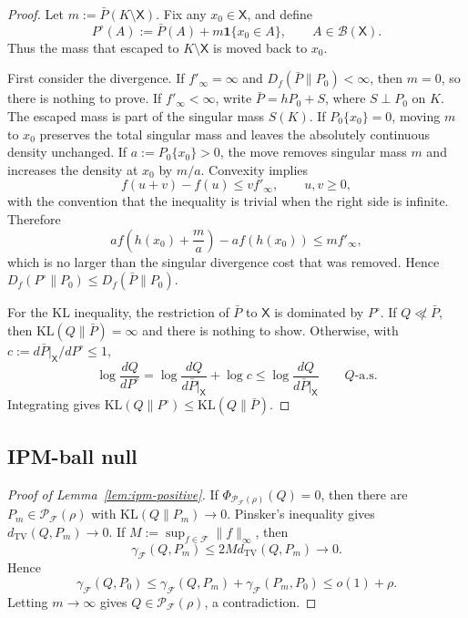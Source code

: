 \documentclass[11pt]{article}
\newcommand{\KL}{\mathrm{KL}}
\newcommand{\Pcal}{\mathcal{P}}
\newcommand{\Fcal}{\mathcal{F}}
\newcommand{\X}{\mathsf{X}}
\newcommand{\TV}{\mathrm{TV}}
\newcommand{\dd}{d}
\newcommand{\B}{\mathcal{B}}
\newcommand{\one}{\mathbf{1}}
\theoremstyle{definition}
\theoremstyle{definition}
\begin{document}
\begin{proof}
Let \(m:=\bar P(K\setminus\X)\).  Fix any \(x_0\in\X\), and define
\[
  P^\circ(A):=\bar P(A)+m\one\{x_0\in A\},\qquad A\in\B(\X).
\]
Thus the mass that escaped to \(K\setminus\X\) is moved back to \(x_0\).

First consider the divergence.  If \(f'_\infty=\infty\) and \(D_f(\bar P\|P_0)<\infty\), then \(m=0\), so there is nothing to prove.  If \(f'_\infty<\infty\), write \(\bar P=hP_0+S\), where \(S\perp P_0\) on \(K\).  The escaped mass is part of the singular mass \(S(K)\).  If \(P_0\{x_0\}=0\), moving \(m\) to \(x_0\) preserves the total singular mass and leaves the absolutely continuous density unchanged.  If \(a:=P_0\{x_0\}>0\), the move removes singular mass \(m\) and increases the density at \(x_0\) by \(m/a\).  Convexity implies
\[
  f(u+v)-f(u)\le v f'_\infty,
  \qquad u,v\ge0,
\]
with the convention that the inequality is trivial when the right side is infinite.  Therefore
\[
  a f\!\left(h(x_0)+\frac{m}{a}\right)-a f(h(x_0))
  \le m f'_\infty,
\]
which is no larger than the singular divergence cost that was removed.  Hence \(D_f(P^\circ\|P_0)\le D_f(\bar P\|P_0)\).

For the KL inequality, the restriction of \(\bar P\) to \(\X\) is dominated by \(P^\circ\).  If \(Q\not\ll\bar P\), then \(\KL(Q\|\bar P)=\infty\) and there is nothing to show.  Otherwise, with \(c:=\dd\bar P|_{\X}/\dd P^\circ\le1\),
\[
  \log\frac{\dd Q}{\dd P^\circ}
  =\log\frac{\dd Q}{\dd\bar P|_{\X}}+\log c
  \le \log\frac{\dd Q}{\dd\bar P|_{\X}}
  \qquad Q\text{-a.s.}
\]
Integrating gives \(\KL(Q\|P^\circ)\le\KL(Q\|\bar P)\).
\end{proof}


\subsection{IPM-ball null}\label{subsec:ipm}


\begin{proof}[Proof of Lemma~\ref{lem:ipm-positive}]
If \(\Phi_{\Pcal_{\Fcal}(\rho)}(Q)=0\), then there are \(P_m\in\Pcal_{\Fcal}(\rho)\) with \(\KL(Q\|P_m)\to0\).  Pinsker's inequality gives \(d_{\TV}(Q,P_m)\to0\).  If \(M:=\sup_{f\in\Fcal}\|f\|_\infty\), then
\[
  \gamma_{\Fcal}(Q,P_m)
  \le 2M d_{\TV}(Q,P_m)\to0.
\]
Hence
\[
  \gamma_{\Fcal}(Q,P_0)
  \le \gamma_{\Fcal}(Q,P_m)+\gamma_{\Fcal}(P_m,P_0)
  \le o(1)+\rho.
\]
Letting \(m\to\infty\) gives \(Q\in\Pcal_{\Fcal}(\rho)\), a contradiction.
\end{proof}
\end{document}
